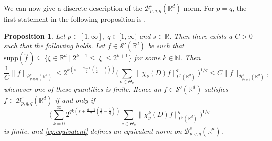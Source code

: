 \documentclass{amsart}
\newtheorem{proposition}[theorem]{Proposition}
\theoremstyle{definition}
\newcommand{\R}{\mathbb{R}}
\newcommand{\N}{\mathbb{N}}
\newcommand {\Rd}{\mathbb{R}^{d}}
\newcommand {\Baspqq}{\mathcal{B}^{s}_{p,q,q}(\Rd)}
\newcommand {\supp}{\mathrm{supp}}
\newcommand{\wh}{\widehat}
\newcommand {\Sw}{\mathcal{S}}
\numberwithin{equation}{section}
\begin{document}
We can now give a discrete description of the $\Baspqq$-norm. For $p=q$, the first statement in the following proposition is \cite[Proposition 4.1]{Rozendaal2021LocalSmoothing}.



\begin{proposition}\label{prop:discrete}
Let $p\in[1,\infty]$, $q\in[1,\infty)$ and $s \in \R$. Then there exists a $C>0$ such that the following holds. Let $f\in \Sw'(\Rd)$ be such that $\supp(\wh{f}\,)\subseteq\{\xi\in\Rd\mid 2^{k-1}\leq |\xi|\leq 2^{k+1}\}$ for some $k\in\N$. Then
\[
\frac{1}{C}\|f\|_{\Baspqq}\leq 2^{k(s+\frac{d-1}{2}(\frac{1}{2}-\frac{1}{q}))}\Big(\sum_{\nu\in\Theta_{k}}\|\chi_{\nu}(D)f\|_{L^{p}(\Rd)}^{q}\Big)^{1/q}\leq C\|f\|_{\Baspqq},
\]
whenever one of these quantities is finite. Hence an $f \in \Sw'(\Rd)$ satisfies $f\in\Baspqq$ if and only if 
\begin{equation}\label{eq:equivalent}
\Big(\sum_{k=0}^{\infty}2^{qk(s+\frac{d-1}{2}( \frac{1}{2} - \frac{1}{q}))}\sum_{\nu\in\Theta_{k}}\| \chi_{\nu}^{k}(D) f \|^q_{L^{p}(\Rd)}\Big)^{1/q}
\end{equation}
is finite, and \eqref{eq:equivalent} defines an equivalent norm on $\Baspqq$.
\end{proposition}
\end{document}
